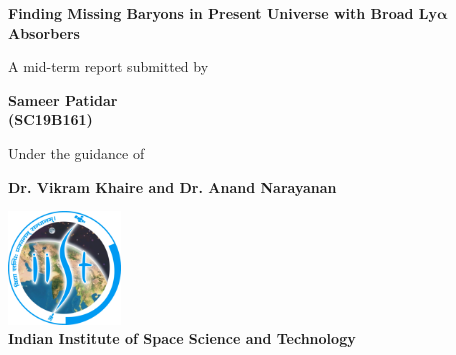 \documentclass[12pt,oneside,noprintercorrection]{iut}
\newcommand\blankpage{%
    \null
    \thispagestyle{empty}%
    \addtocounter{page}{-1}%
    \newpage}
\begin{document}
\begin{titlepage}
\begin{center}
        \vspace*{1cm}
            
        \Huge
        \textbf{Finding Missing Baryons in Present Universe with Broad Ly$\mathbf{\alpha}$ Absorbers}
        
        \vspace{10mm}

        \large{A mid-term report submitted by}
        
        \LARGE

        \vspace{8mm}
            
        \textbf{Sameer Patidar \\ (SC19B161)}
        \vspace{10mm}

        \large{Under the guidance of} \\

        \LARGE
        
        \vspace{8mm}

        \textbf{Dr. Vikram Khaire and Dr. Anand Narayanan}

        
            
        \vfill
            
        \includegraphics[width=3cm]{IIST.png} \\
        \vspace{0.7cm}  
        \LARGE
        \textbf{Indian Institute of Space Science and Technology}\\
            
    \end{center}

\end{titlepage}

\afterpage{\blankpage}

\pagestyle{plain}
\end{document}
